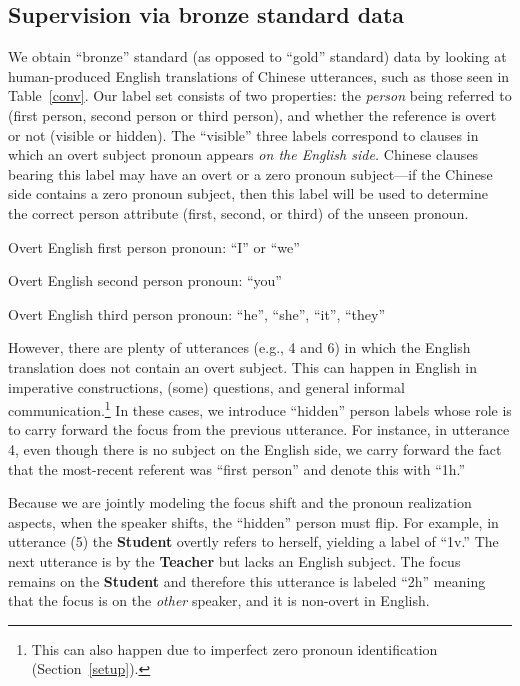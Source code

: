 \documentclass[11pt]{report}
\newcommand{\speaker}[1]{{\bf\footnotesize\textsf{#1}}}
\begin{document}
\subsection{Supervision via bronze standard data} \label{labels}

We obtain ``bronze'' standard (as opposed to ``gold'' standard) data by looking at human-produced English translations of Chinese utterances, such as those seen in Table~\ref{conv}. Our label set consists of two properties: the \emph{person} being referred to (first person, second person or third person), and whether the reference is overt or not (visible or hidden).
The ``visible'' three labels correspond to clauses in which an overt subject pronoun appears \emph{on the English side.} Chinese clauses bearing this label may have an overt or a zero pronoun subject---if the Chinese side contains a zero pronoun subject, then this label will be used to determine the correct person attribute (first, second, or third) of the unseen pronoun.

\begin{description} \itemsep1pt \parskip0pt 
\item[1v:] Overt English first person pronoun: ``I'' or ``we''
\item[2v:] Overt English second person pronoun: ``you''
\item[3v:] Overt English third person pronoun: ``he'', ``she'', ``it'', ``they'' 
\end{description}

However, there are plenty of utterances (e.g., 4 and 6) in which the English translation does not contain an overt subject. This can happen in English in imperative constructions, (some) questions, and general informal communication.\footnote{This can also happen due to imperfect zero pronoun identification (Section~\ref{setup}).}
In these cases, we introduce ``hidden'' person labels whose role is to carry forward the focus from the previous utterance. For instance, in utterance 4, even though there is no subject on the English side, we carry forward the fact that the most-recent referent was ``first person'' and denote this with ``1h.''

Because we are jointly modeling the focus shift and the pronoun realization aspects, when the speaker shifts, the ``hidden'' person must flip. For example, in utterance (5) the \speaker{Student} overtly refers to herself, yielding a label of ``1v.'' The next utterance is by the \speaker{Teacher} but lacks an English subject. The focus remains on the \speaker{Student} and therefore this utterance is labeled ``2h'' meaning that the focus is on the \emph{other} speaker, and it is non-overt in English.
\end{document}
